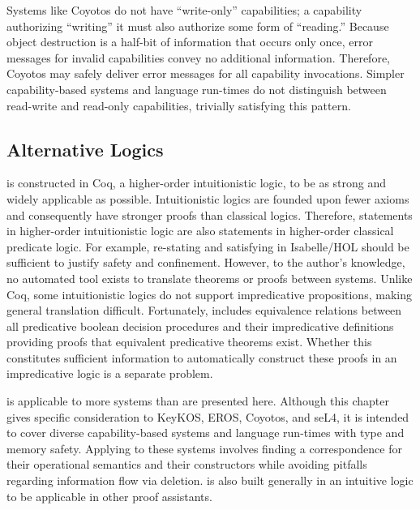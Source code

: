 Systems like Coyotos do not have ``write-only'' capabilities; a capability authorizing ``writing'' it must also authorize some form of ``reading.''
Because object destruction is a half-bit of information that occurs only once, error messages for invalid capabilities convey no additional information.
Therefore, Coyotos may safely deliver error messages for all capability invocations.
Simpler capability-based systems and language run-times do not distinguish between read-write and read-only capabilities, trivially satisfying this pattern.

\subsection{Alternative Logics}

\TMmodelName{} is constructed in Coq, a higher-order intuitionistic logic, to be as strong and widely applicable as possible.
Intuitionistic logics are founded upon fewer axioms and consequently have stronger proofs than classical logics.
Therefore, statements in higher-order intuitionistic logic are also statements in higher-order classical predicate logic.
For example, re-stating and satisfying \TMmodelName{} in Isabelle/HOL \cite{Nipkow:2002:IPA} should be sufficient to justify safety and confinement.
However, to the author's knowledge, no automated tool exists to translate theorems or proofs between systems.
Unlike Coq, some intuitionistic logics do not support impredicative propositions, making general translation difficult.
Fortunately, \TMmodelName{} includes equivalence relations between all predicative boolean decision procedures and their impredicative definitions providing proofs that equivalent predicative theorems exist.
Whether this constitutes sufficient information to automatically construct these proofs in an impredicative logic is a separate problem.

\TMmodelName{} is applicable to more systems than are presented here.
Although this chapter gives specific consideration to KeyKOS, EROS, Coyotos, and seL4, it is intended to cover diverse capability-based systems and language run-times with type and memory safety.
Applying \TMmodelName{} to these systems involves finding a correspondence for their operational semantics and their constructors while avoiding pitfalls regarding information flow via deletion.
\TMmodelName{} is also built generally in an intuitive logic to be applicable in other proof assistants.

